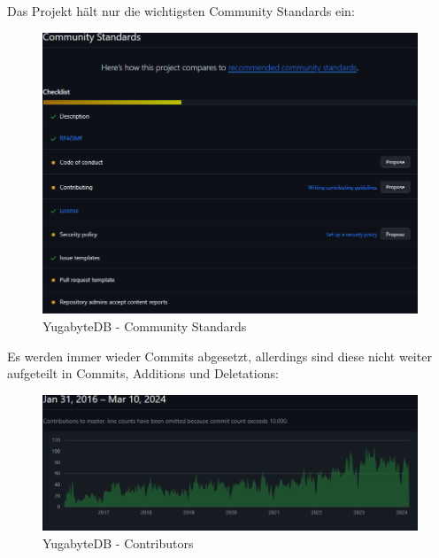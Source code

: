 \begin{flushleft}
    Das Projekt hält nur die wichtigsten Community Standards ein:
    \begin{figure}[H]
        \centering
        \includegraphics[width=0.75\linewidth]{source/implementation/evaluation/postgresql_ha_solutions/insights/yugabytedb/community Standards}
        \caption{YugabyteDB - Community Standards}
        \label{fig:community Standards_yugabyte-db}
    \end{figure}

    Es werden immer wieder Commits abgesetzt, allerdings sind diese nicht weiter aufgeteilt in Commits, Additions und Deletations:
    \begin{figure}[H]
        \centering
        \includegraphics[width=0.75\linewidth]{source/implementation/evaluation/postgresql_ha_solutions/insights/yugabytedb/contributors_to_yugabyte_yugabyte-db}
        \caption{YugabyteDB - Contributors}
        \label{fig:contributors_to_yugabyte_yugabyte-db}
    \end{figure}
\end{flushleft}
\clearpage
{}
\recalctypearea
